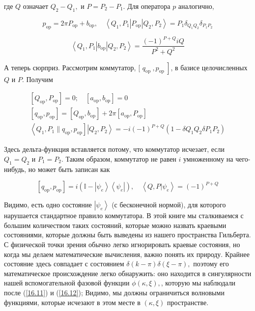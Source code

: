 \documentclass[main.tex]{subfiles}
\begin{document}
где $Q$ означает $Q_{2}-Q_{1},$ и $P=P_{2}-P_{1}$. Для оператора $p$ аналогично,

\begin{equation}\label{16.19}
p_{\mathrm{op}}=2 \pi P_{\mathrm{op}}+b_{\mathrm{op}}, \quad\left\langle Q_{1}, P_{1}\left|P_{\mathrm{op}}\right| Q_{2}, P_{2}\right\rangle= P_{1} \delta_{Q_{1} Q_{2}} \delta_{P_{1} P_{2}}
\end{equation}

\begin{equation}\label{16.20} 
\left\langle Q_{1}, P_{1}\left|b_{\mathrm{op}}\right| Q_{2}, P_{2}\right\rangle=\frac{(-1)^{P+Q} i Q}{P^{2}+Q^{2}}
\end{equation}

А теперь сюрприз. Рассмотрим коммутатор, [ $\left.q_{\text {op }}, p_{\text {op }}\right]$, в базисе целочисленных $Q$ и $P$. Получим

\begin{equation}\label{16.21} 
\begin{array}{l}
{\left[Q_{\mathrm{op}}, P_{\mathrm{op}}\right]=0 ; \quad\left[a_{\mathrm{op}}, b_{\mathrm{op}}\right]=0} \\
{\left[q_{\mathrm{op}}, p_{\mathrm{op}}\right]=\left[Q_{\mathrm{op}}, b_{\mathrm{op}}\right]+2 \pi\left[a_{\mathrm{op}}, P_{\mathrm{op}}\right]} \\
{\left\langle Q_{1}, P_{1} \| q_{\mathrm{op}}, p_{\mathrm{op}}\right]\left|Q_{2}, P_{2}\right\rangle=- i(-1)^{P+Q}\left(1-\delta Q_{1} Q_{2} \delta P_{1} P_{2}\right)}
\end{array}
\end{equation}

Здесь дельта-функция вставляется потому, что коммутатор исчезает, если $Q_{1}=Q_{2}$ и $P_{1}=P_{2}$. Таким образом, коммутатор не равен $i$ умноженному на чего-нибудь, но может быть записан как

\begin{equation}\label{16.22}
\left[q_{\mathrm{op}}, p_{\mathrm{op}}\right] = i\left(\mathbb{I}-\left|\psi_{e}\right\rangle\left\langle\psi_{e}\right|\right), \quad  \left\langle Q, P | \psi_{e}\right\rangle=(-1)^{P+Q}
\end{equation}

Видимо, есть одно состояние $\left|\psi_{e}\right\rangle$ (с бесконечной нормой), для которого нарушается стандартное правило коммутатора. В этой книге мы сталкиваемся с большим количеством таких состояний, которые можно назвать краевыми состояниями, которые должны быть выведены из нашего пространства Гильберта. С физической точки зрения обычно легко игнорировать краевые состояния, но когда мы делаем математические вычисления, важно понять их природу. Крайнее состояние здесь совпадает с состоянием $\delta(k-\pi) \delta(\xi-\pi),$ поэтому его математическое происхождение легко обнаружить: оно находится в сингулярности нашей вспомогательной фазовой функции $\phi(\kappa, \xi),$, которую мы наблюдали после (\ref{16.11}) и (\ref{16.12}); Видимо, мы должны ограничиться волновыми функциями, которые исчезают в этом месте в $(\kappa, \xi)$ пространстве.
\end{document}
